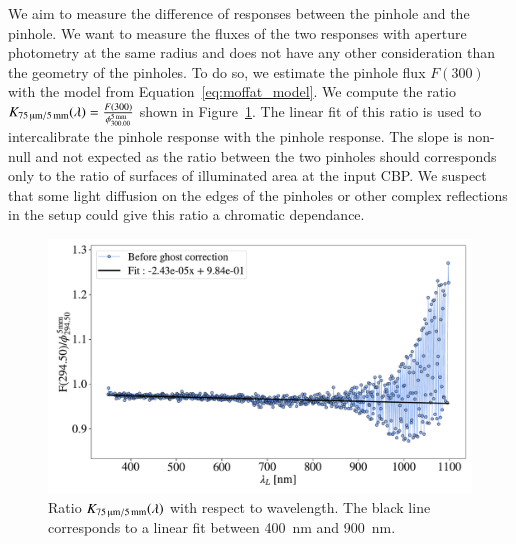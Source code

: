 We aim to measure the difference of \SD responses between the \spinhole pinhole and the \bpinhole pinhole. We want to measure the fluxes of the two responses with aperture photometry at the same radius and does not have any other consideration than the geometry of the pinholes. To do so, we estimate the \spinhole pinhole flux $F(300)$ with the model from Equation~\ref{eq:moffat_model}. We compute the ratio $K_\mathrm{\SI{75}{\micro\meter}/\SI{5}{\milli\meter}}(\lambda)=\frac{F(300)}{\phi^{\SI{5}{\milli\meter}}_{300.00}}$ shown in Figure~\ref{fig:ratio_pinholes}. The linear fit of this ratio is used to intercalibrate the \bpinhole pinhole \SD response with the \spinhole pinhole \SD response. The slope is non-null and not expected as the ratio between the two pinholes should corresponds only to the ratio of surfaces of illuminated area at the input CBP. We suspect that some light diffusion on the edges of the pinholes or other complex reflections in the setup could give this ratio a chromatic dependance.

\begin{figure}[h]
    \centering
    \includegraphics[width=\columnwidth]{fig/ratio_pinholes.pdf}
    \caption{Ratio $K_\mathrm{\SI{75}{\micro\meter}/\SI{5}{\milli\meter}}(\lambda)$ with respect to wavelength. The black line corresponds to a linear fit between \SI{400}{\nm} and \SI{900}{\nm}.}
    \label{fig:ratio_pinholes}
\end{figure}


